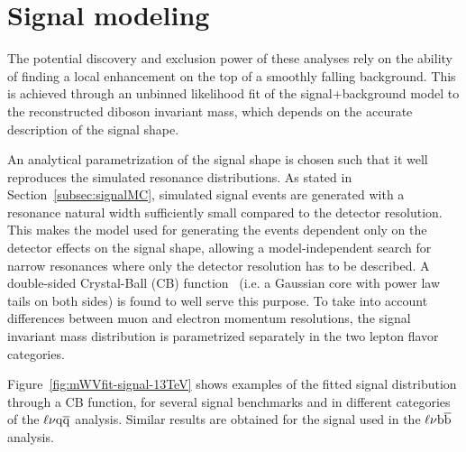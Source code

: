 \section{Signal modeling}\label{sec:signalModel}

The potential discovery and exclusion power of these analyses rely on the ability of finding a local enhancement on the top of a smoothly falling background. 
This is achieved through an unbinned likelihood fit of the signal+background model to the reconstructed diboson invariant mass, which depends on the accurate description of the signal shape.

An analytical parametrization of the signal shape is chosen such that it well reproduces the simulated resonance distributions.
As stated in Section~\ref{subsec:signalMC}, simulated signal events are generated with a resonance natural width sufficiently small compared to the detector resolution.
This makes the model used for generating the events dependent only on the detector effects on the signal shape, allowing a model-independent search for narrow resonances
where only the detector resolution has to be described. A double-sided Crystal-Ball (CB) function~\cite{CrystalBallRef} (i.e. a Gaussian core with power law tails on both sides) is found to well serve this purpose.
To take into account differences between muon and electron momentum resolutions, the signal invariant mass distribution is parametrized separately in the two lepton flavor categories.

Figure~\ref{fig:mWVfit-signal-13TeV} shows examples of the fitted signal distribution through a CB function, for several signal benchmarks and in different \mJ categories of the $\ell\nu\mathrm{q}\overline{\mathrm{q}}$ analysis.
Similar results are obtained for the \Wpr signal used in the $\ell\nu{\mathrm{b}\overline{\mathrm{b}}}$ analysis.


